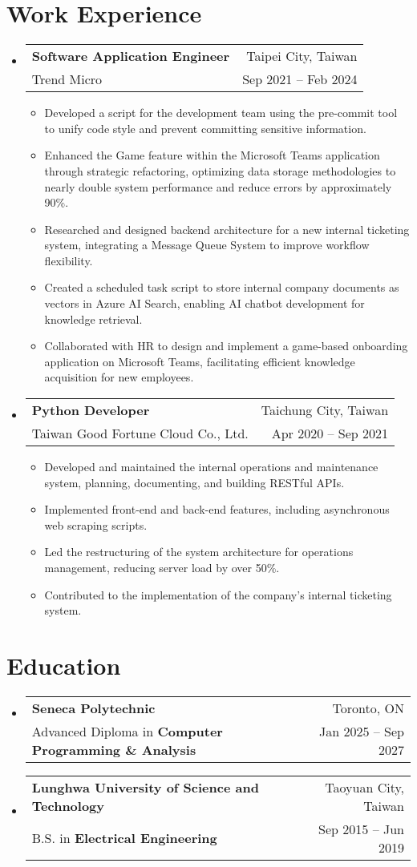 \documentclass[letterpaper,11pt]{article}
\makeatletter
\newcommand{\resumeItemNH}[1]{
  \item\small{
    {#1 \vspace{0pt}}
  }
}
\newcommand{\resumeSubheading}[4]{
  \vspace{0pt}\item
    \begin{tabular*}{\textwidth}{l@{\extracolsep{\fill}}r}
      \textbf{#1} & #2 \\
      \small#3 & \small#4 \\
    \end{tabular*}\vspace{-6pt}
}
\newcommand{\resumeSubHeadingListStart}{\begin{itemize}[leftmargin=0pt,label={}]}
\newcommand{\resumeSubHeadingListEnd}{\end{itemize}}
\newcommand{\resumeItemListStart}{\begin{itemize}[leftmargin=*]}
\newcommand{\resumeItemListEnd}{\end{itemize}}
\makeatother
\begin{document}
\section*{Work Experience}
  \resumeSubHeadingListStart
    \resumeSubheading
      {Software Application Engineer}{Taipei City, Taiwan}
      {Trend Micro}{Sep 2021 -- Feb 2024}
      \resumeItemListStart
        \resumeItemNH{Developed a script for the development team using the pre-commit tool to unify code style and prevent committing sensitive information.}
        \resumeItemNH{Enhanced the Game feature within the Microsoft Teams application through strategic refactoring, optimizing data storage methodologies to nearly double system performance and reduce errors by approximately 90\%.}
        \resumeItemNH{Researched and designed backend architecture for a new internal ticketing system, integrating a Message Queue System to improve workflow flexibility.}
        \resumeItemNH{Created a scheduled task script to store internal company documents as vectors in Azure AI Search, enabling AI chatbot development for knowledge retrieval.}
        \resumeItemNH{Collaborated with HR to design and implement a game-based onboarding application on Microsoft Teams, facilitating efficient knowledge acquisition for new employees.}
      \resumeItemListEnd
    \resumeSubheading
      {Python Developer}{Taichung City, Taiwan}
      {Taiwan Good Fortune Cloud Co., Ltd.}{Apr 2020 -- Sep 2021}
      \resumeItemListStart
        \resumeItemNH{Developed and maintained the internal operations and maintenance system, planning, documenting, and building RESTful APIs.}
        \resumeItemNH{Implemented front-end and back-end features, including asynchronous web scraping scripts.}
        \resumeItemNH{Led the restructuring of the system architecture for operations management, reducing server load by over 50\%.}
        \resumeItemNH{Contributed to the implementation of the company's internal ticketing system.}
      \resumeItemListEnd
  \resumeSubHeadingListEnd

\section*{Education}
  \resumeSubHeadingListStart
    \resumeSubheading
      {Seneca Polytechnic}{Toronto, ON}
      {Advanced Diploma in \textbf{Computer Programming \& Analysis}}{Jan 2025 -- Sep 2027}
    \resumeSubheading
      {Lunghwa University of Science and Technology}{Taoyuan City, Taiwan}
      {B.S. in \textbf{Electrical Engineering}}{Sep 2015 -- Jun 2019}
  \resumeSubHeadingListEnd
\end{document}
